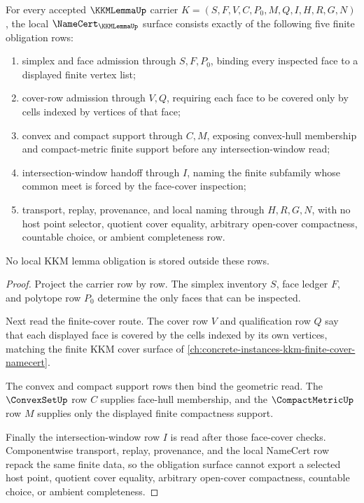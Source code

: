 \begin{theorem}
\label{thm:kkm-lemma-namecert-obligations}
For every accepted $\KKMLemmaUp$ carrier $K=(S,F,V,C,P_0,M,Q,I,H,R,G,N)$, the local $\NameCert_{\KKMLemmaUp}$ surface consists exactly of the following five finite obligation rows:
\begin{enumerate}
\item simplex and face admission through $S,F,P_0$, binding every inspected face to a displayed finite vertex list;
\item cover-row admission through $V,Q$, requiring each face to be covered only by cells indexed by vertices of that face;
\item convex and compact support through $C,M$, exposing convex-hull membership and compact-metric finite support before any intersection-window read;
\item intersection-window handoff through $I$, naming the finite subfamily whose common meet is forced by the face-cover inspection;
\item transport, replay, provenance, and local naming through $H,R,G,N$, with no host point selector, quotient cover equality, arbitrary open-cover compactness, countable choice, or ambient completeness row.
\end{enumerate}
No local KKM lemma obligation is stored outside these rows.
\end{theorem}
\begin{proof}
Project the carrier row by row. The simplex inventory $S$, face ledger $F$, and polytope row $P_0$ determine the only faces that can be inspected.

Next read the finite-cover route. The cover row $V$ and qualification row $Q$ say that each displayed face is covered by the cells indexed by its own vertices, matching the finite KKM cover surface of \autoref{ch:concrete-instances-kkm-finite-cover-namecert}.

The convex and compact support rows then bind the geometric read. The $\ConvexSetUp$ row $C$ supplies face-hull membership, and the $\CompactMetricUp$ row $M$ supplies only the displayed finite compactness support.

Finally the intersection-window row $I$ is read after those face-cover checks. Componentwise transport, replay, provenance, and the local NameCert row repack the same finite data, so the obligation surface cannot export a selected host point, quotient cover equality, arbitrary open-cover compactness, countable choice, or ambient completeness.
\end{proof}

